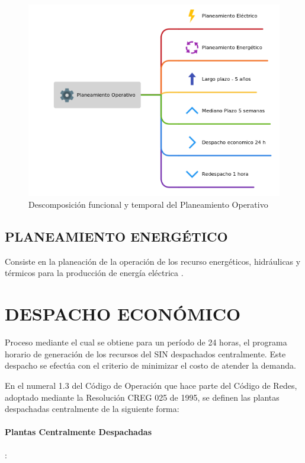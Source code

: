 \documentclass[a5paper]{book}%
\begin{document}
\begin{figure}[H]
  \centering
  \caption{Descomposición funcional y temporal del Planeamiento
    Operativo}
  \label{fig:planeamineto-operativo}
  \includegraphics[width=1\linewidth]{planeamineto-operativo}
\end{figure}

\subsection{PLANEAMIENTO ENERGÉTICO}

Consiste en la planeación de la operación de los recurso energéticos,
hidráulicas y térmicos para la producción de energía eléctrica
\cite{CREG0251995}.

\section{DESPACHO ECONÓMICO}
Proceso mediante el cual se obtiene para un período de 24 horas, el programa horario de generación de los recursos del SIN despachados centralmente. Este despacho se efectúa con el criterio de minimizar el costo de atender la demanda.

En el numeral 1.3 del Código de Operación que hace parte del Código de Redes, adoptado mediante la Resolución CREG 025 de 1995, se definen las plantas despachadas centralmente de la siguiente forma:

\paragraph{Plantas Centralmente Despachadas}:
\end{document}
